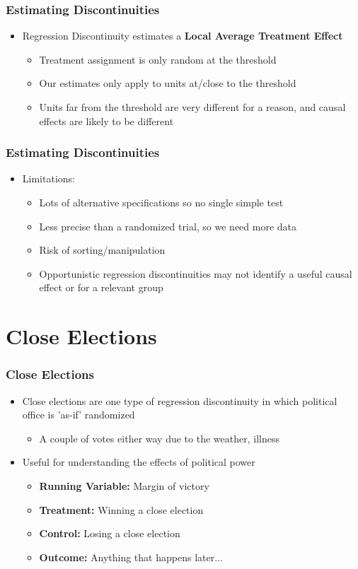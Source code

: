 \documentclass[xcolor=x11names,compress]{beamer}\usepackage[]{graphicx}\usepackage[]{color}
\renewcommand{\(}{\begin{columns}}
\renewcommand{\)}{\end{columns}}
\newcommand{\<}[1]{\begin{column}{#1}}
\renewcommand{\>}{\end{column}}
\begin{document}
\begin{frame}
\frametitle{Estimating Discontinuities}
\begin{itemize}
\item Regression Discontinuity estimates a \textbf{Local Average Treatment Effect}
\pause
\begin{itemize}
\item Treatment assignment is only random at the threshold
\pause
\item Our estimates only apply to units at/close to the threshold
\pause
\item Units far from the threshold are very different for a reason, and causal effects are likely to be different
\end{itemize}
\end{itemize}
\end{frame}


\begin{frame}
\frametitle{Estimating Discontinuities}
\begin{itemize}
\item Limitations:
\begin{itemize}
\item Lots of alternative specifications so no single simple test
\pause
\item Less precise than a randomized trial, so we need more data
\pause
\item Risk of sorting/manipulation
\pause
\item Opportunistic regression discontinuities may not identify a useful causal effect or for a relevant group
\end{itemize}
\end{itemize}
\end{frame}

\section{Close Elections}

\begin{frame}
\frametitle{Close Elections}
\begin{itemize}
\item Close elections are one type of regression discontinuity in which political office is 'as-if' randomized
\pause
\begin{itemize}
\item A couple of votes either way due to the weather, illness
\end{itemize}
\pause
\item Useful for understanding the effects of political power
\pause
\begin{itemize}
\item \textbf{Running Variable: }Margin of victory
\item \textbf{Treatment: }Winning a close election
\item \textbf{Control: }Losing a close election
\item \textbf{Outcome: }Anything that happens later...
\end{itemize}
\end{itemize}
\end{frame}
\end{document}
